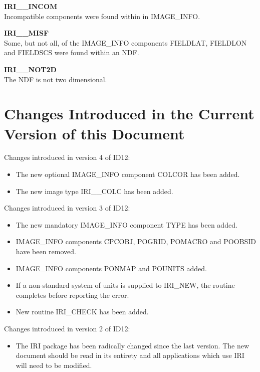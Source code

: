 \begin{description}
\item {\bf IRI\_\_INCOM}\\
Incompatible components were found within in IMAGE\_INFO.

\item {\bf IRI\_\_MISF}\\
Some, but not all, of the IMAGE\_INFO components FIELDLAT, FIELDLON and FIELDSCS 
were found within an NDF.

\item {\bf IRI\_\_NOT2D}\\
The NDF is not two dimensional.

\end{description}

\section{Changes Introduced in the Current Version of this Document}
\label {SEC:CHANGES}

Changes introduced in version 4 of ID12:
\begin{itemize}
\item The new optional IMAGE\_INFO component COLCOR has been added.
\item The new image type IRI\_\_COLC has been added.
\end{itemize}

Changes introduced in version 3 of ID12:
\begin{itemize}
\item The new mandatory IMAGE\_INFO component TYPE has been added.
\item IMAGE\_INFO components CPCOBJ, POGRID, POMACRO and POOBSID have been 
removed.
\item IMAGE\_INFO components PONMAP and POUNITS added.
\item If a non-standard system of units is supplied to IRI\_NEW, the routine
completes before reporting the error. 
\item New routine IRI\_CHECK has been added.
\end{itemize}

Changes introduced in version 2 of ID12:
\begin{itemize}
\item The IRI package has been radically changed since the last version. The new
document should be read in its entirety and all applications which use IRI will
need to be modified. 
\end{itemize}

 
